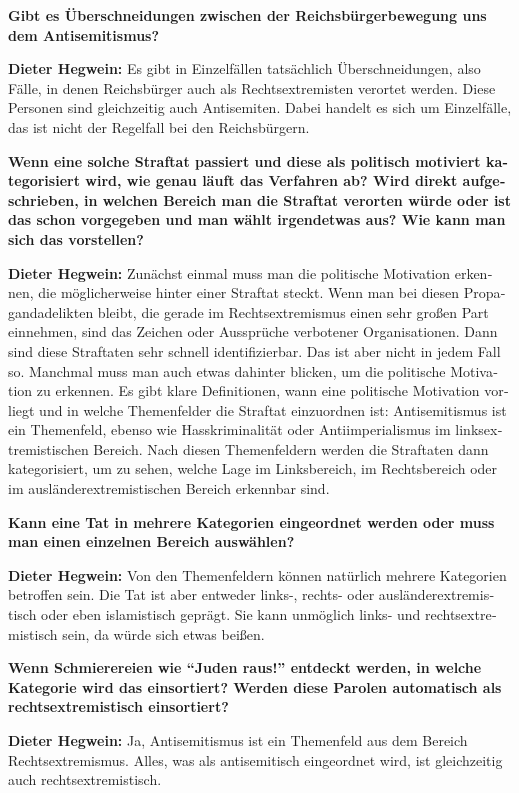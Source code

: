 \begin{otherlanguage}{ngerman}
\textbf{Gibt es Überschneidungen zwischen der Reichsbürgerbewegung uns dem Antisemitismus?}

\textbf{Dieter Hegwein:} Es gibt in Einzelfällen tatsächlich Überschneidungen, also Fälle, in denen Reichsbürger auch als Rechtsextremisten verortet werden. Diese Personen sind gleichzeitig auch Antisemiten. Dabei handelt es sich um Einzelfälle, das ist nicht der Regelfall bei den Reichsbürgern.

\textbf{Wenn eine solche Straftat passiert und diese als politisch motiviert kategorisiert wird, wie genau läuft das Verfahren ab? Wird direkt aufgeschrieben, in welchen Bereich man die Straftat verorten würde oder ist das schon vorgegeben und man wählt irgendetwas aus? Wie kann man sich das vorstellen?}

\textbf{Dieter Hegwein:}  Zunächst einmal muss man die politische Motivation erkennen, die möglicherweise hinter einer Straftat steckt. Wenn man bei diesen Propagandadelikten bleibt, die gerade im Rechtsextremismus einen sehr großen Part einnehmen, sind das Zeichen oder Aussprüche verbotener Organisationen. Dann sind diese Straftaten sehr schnell identifizierbar. Das ist aber nicht in jedem Fall so. Manchmal muss man auch etwas dahinter blicken, um die politische Motivation zu erkennen. Es gibt klare Definitionen, wann eine politische Motivation vorliegt und in welche Themenfelder die Straftat einzuordnen ist: Antisemitismus ist ein Themenfeld, ebenso wie Hasskriminalität oder Antiimperialismus im linksextremistischen Bereich. Nach diesen Themenfeldern werden die Straftaten dann kategorisiert, um zu sehen, welche Lage im Linksbereich, im Rechtsbereich oder im ausländerextremistischen Bereich erkennbar sind.

\textbf{Kann eine Tat in mehrere Kategorien eingeordnet werden oder muss man einen einzelnen Bereich auswählen?} 

\textbf{Dieter Hegwein:} Von den Themenfeldern können natürlich mehrere Kategorien betroffen sein. Die Tat ist aber entweder links-, rechts- oder ausländerextremistisch oder eben islamistisch geprägt. Sie kann unmöglich links- und rechtsextremistisch sein, da würde sich etwas beißen.

\textbf{Wenn Schmierereien wie "`Juden raus!"' entdeckt werden, in welche Kategorie wird das einsortiert? Werden diese Parolen automatisch als rechtsextremistisch einsortiert?}

\textbf{Dieter Hegwein:} Ja, Antisemitismus ist ein Themenfeld aus dem Bereich Rechtsextremismus. Alles, was als antisemitisch eingeordnet wird, ist gleichzeitig auch rechtsextremistisch.


\end{otherlanguage}
